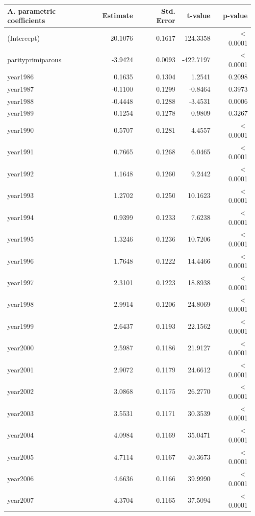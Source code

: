     \begin{table}[H]
    \centering
    \begin{tabular}{lrrrr}
    \textbf{A. parametric coefficients} & Estimate & Std. Error & t-value & p-value \\ 
       \hline
       \hline
  (Intercept) & 20.1076 & 0.1617 & 124.3358 & $<$ 0.0001 \\ 
  parityprimiparous & -3.9424 & 0.0093 & -422.7197 & $<$ 0.0001 \\ 
  year1986 & 0.1635 & 0.1304 & 1.2541 & 0.2098 \\ 
  year1987 & -0.1100 & 0.1299 & -0.8464 & 0.3973 \\ 
  year1988 & -0.4448 & 0.1288 & -3.4531 & 0.0006 \\ 
  year1989 & 0.1254 & 0.1278 & 0.9809 & 0.3267 \\ 
  year1990 & 0.5707 & 0.1281 & 4.4557 & $<$ 0.0001 \\ 
  year1991 & 0.7665 & 0.1268 & 6.0465 & $<$ 0.0001 \\ 
  year1992 & 1.1648 & 0.1260 & 9.2442 & $<$ 0.0001 \\ 
  year1993 & 1.2702 & 0.1250 & 10.1623 & $<$ 0.0001 \\ 
  year1994 & 0.9399 & 0.1233 & 7.6238 & $<$ 0.0001 \\ 
  year1995 & 1.3246 & 0.1236 & 10.7206 & $<$ 0.0001 \\ 
  year1996 & 1.7648 & 0.1222 & 14.4466 & $<$ 0.0001 \\ 
  year1997 & 2.3101 & 0.1223 & 18.8938 & $<$ 0.0001 \\ 
  year1998 & 2.9914 & 0.1206 & 24.8069 & $<$ 0.0001 \\ 
  year1999 & 2.6437 & 0.1193 & 22.1562 & $<$ 0.0001 \\ 
  year2000 & 2.5987 & 0.1186 & 21.9127 & $<$ 0.0001 \\ 
  year2001 & 2.9072 & 0.1179 & 24.6612 & $<$ 0.0001 \\ 
  year2002 & 3.0868 & 0.1175 & 26.2770 & $<$ 0.0001 \\ 
  year2003 & 3.5531 & 0.1171 & 30.3539 & $<$ 0.0001 \\ 
  year2004 & 4.0984 & 0.1169 & 35.0471 & $<$ 0.0001 \\ 
  year2005 & 4.7114 & 0.1167 & 40.3673 & $<$ 0.0001 \\ 
  year2006 & 4.6636 & 0.1166 & 39.9990 & $<$ 0.0001 \\ 
  year2007 & 4.3704 & 0.1165 & 37.5094 & $<$ 0.0001 \\ 

\end{tabular}
\end{table}
